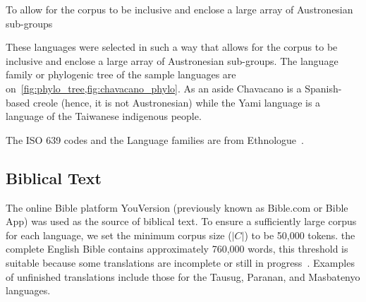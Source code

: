 \documentclass{article}
\begin{document}
To allow for the corpus to be inclusive and enclose a large array of
Austronesian sub-groups

These languages were selected in such a way that allows for the corpus to be
inclusive and enclose a large array of Austronesian sub-groups. The language
family or phylogenic tree of the sample languages are
on~\cref{fig:phylo_tree,fig:chavacano_phylo}. As an aside Chavacano is a
Spanish-based creole (hence, it is not Austronesian) while the Yami language is
a language of the Taiwanese indigenous people.

The ISO 639 codes and the Language families are from Ethnologue~\cite{ESF25}.
\newpage \thispagestyle{empty}  \newpage%

\subsection{Biblical Text}

The online Bible platform YouVersion (previously known as Bible.com or Bible
App) was used as the source of biblical text. To ensure a sufficiently large
corpus for each language, we set the minimum corpus size (\( |C| \)) to be
50,000 tokens. the complete English Bible contains approximately 760,000 words,
this threshold is suitable because some translations are incomplete or still in
progress~\cite{JJS11}. Examples of unfinished translations include those for
the Tausug, Paranan, and Masbatenyo languages.
\end{document}
